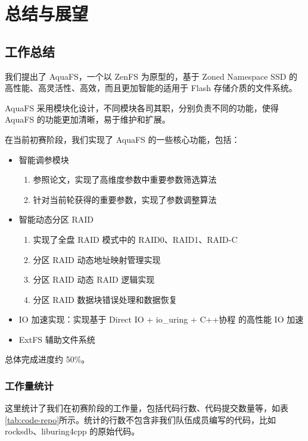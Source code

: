 \section{总结与展望}

\subsection{工作总结}

我们提出了 AquaFS，一个以 ZenFS 为原型的，基于 Zoned Namespace SSD 的高性能、高灵活性、高效，而且更加智能的适用于 Flash 存储介质的文件系统。

AquaFS 采用模块化设计，不同模块各司其职，分别负责不同的功能，使得 AquaFS 的功能更加清晰，易于维护和扩展。

在当前初赛阶段，我们实现了 AquaFS 的一些核心功能，包括：

\begin{itemize}
  \item 智能调参模块
  \begin{enumerate}
    \item 参照论文\cite{mahmud_confd_nodate}，实现了高维度参数中重要参数筛选算法
    \item 针对当前轮获得的重要参数，实现了参数调整算法
  \end{enumerate}
  \item 智能动态分区 RAID
  \begin{enumerate}
    \item 实现了全盘 RAID 模式中的 RAID0、RAID1、RAID-C
    \item 分区 RAID 动态地址映射管理实现
    \item 分区 RAID 动态 RAID 逻辑实现
    \item 分区 RAID 数据块错误处理和数据恢复
  \end{enumerate}
  \item IO 加速实现：实现基于 Direct IO + io\_uring + C++协程 的高性能 IO 加速
  \item ExtFS 辅助文件系统
\end{itemize}

总体完成进度约 50\%。

\subsubsection{工作量统计}

这里统计了我们在初赛阶段的工作量，包括代码行数、代码提交数量等，如表\ref{tab:code-repo}所示。统计的行数不包含非我们队伍成员编写的代码，比如 rocksdb、liburing4cpp 的原始代码。

